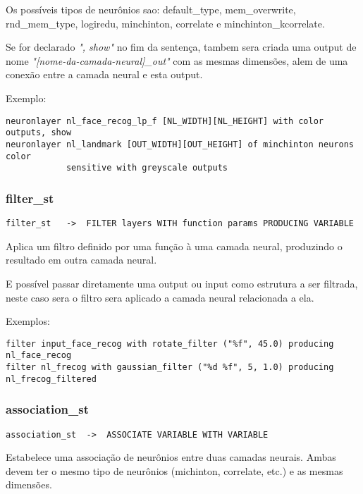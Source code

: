 \documentclass[a4paper,10pt]{article}
\begin{document}
Os poss\'iveis tipos de neur\^onios sao: default\_type, mem\_overwrite, rnd\_mem\_type, logiredu, minchinton, correlate e minchinton\_kcorrelate.

Se for declarado \emph{", show"} no fim da senten\c{c}a, tambem sera criada uma output de nome \emph{"[nome-da-camada-neural]\_out"} com as mesmas dimens\~oes, alem de uma conex\~ao entre a camada neural e esta output.

Exemplo:
\begin{lstlisting}
neuronlayer nl_face_recog_lp_f [NL_WIDTH][NL_HEIGHT] with color outputs, show
neuronlayer nl_landmark [OUT_WIDTH][OUT_HEIGHT] of minchinton neurons color
			sensitive with greyscale outputs
\end{lstlisting}
\vspace{10mm}

	\subsubsection{filter\_st}
		\begin{lstlisting}
filter_st	->	FILTER layers WITH function params PRODUCING VARIABLE
		\end{lstlisting}

Aplica um filtro definido por uma fun\c{c}\~{a}o \`{a} uma camada neural, produzindo o resultado em outra camada neural.

E poss\'ivel passar diretamente uma output ou input como estrutura a ser filtrada, neste caso sera o filtro sera aplicado a camada neural relacionada a ela.

Exemplos:
\begin{lstlisting}
filter input_face_recog with rotate_filter ("%f", 45.0) producing nl_face_recog
filter nl_frecog with gaussian_filter ("%d %f", 5, 1.0) producing nl_frecog_filtered
\end{lstlisting}
\vspace{10mm}

	\subsubsection{association\_st}
		\begin{lstlisting}
association_st	->	ASSOCIATE VARIABLE WITH VARIABLE
		\end{lstlisting}
Estabelece uma associa\c{c}\~{a}o de neur\^onios entre duas camadas neurais. Ambas devem ter o mesmo tipo de neur\^onios (michinton, correlate, etc.) e as mesmas dimens\~oes.
\end{document}
